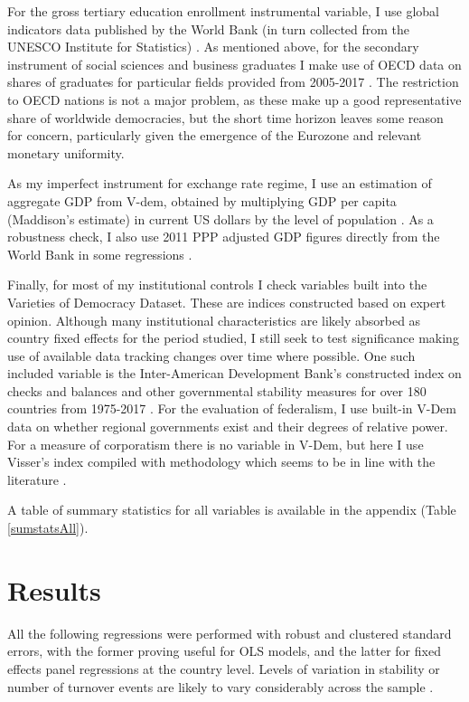 \documentclass{article}
\begin{document}
    For the gross tertiary education enrollment instrumental variable, I use global indicators data published by the World Bank (in turn collected from the UNESCO Institute for Statistics) \citep{world_bank_school_2020}. As mentioned above, for the secondary instrument of social sciences and business graduates I make use of OECD data on shares of graduates for particular fields provided from 2005-2017 \citep{oecd_students_2020}. The restriction to OECD nations is not a major problem, as these make up a good representative share of worldwide democracies, but the short time horizon leaves some reason for concern, particularly given the emergence of the Eurozone and relevant monetary uniformity.

    As my imperfect instrument for exchange rate regime, I use an estimation of aggregate GDP from V-dem, obtained by multiplying GDP per capita (Maddison’s estimate) in current US dollars by the level of population \citep{michael_coppedge_v-dem_2020}. As a robustness check, I also use 2011 PPP adjusted GDP figures directly from the World Bank in some regressions \citep{world_bank_gdp_2020}.

    Finally, for most of my institutional controls I check variables built into the Varieties of Democracy Dataset. These are indices constructed based on expert opinion. Although many institutional characteristics are likely absorbed as country fixed effects for the period studied, I still seek to test significance making use of available data tracking changes over time where possible. One such included variable is the Inter-American Development Bank’s constructed index on checks and balances and other governmental stability measures for over 180 countries from 1975-2017 \citep{scartascini_database_2018}. For the evaluation of federalism, I use built-in V-Dem data on whether regional governments exist and their degrees of relative power. For a measure of corporatism there is no variable in V-Dem, but here I use Visser’s index compiled with methodology which seems to be in line with the literature \citep{kenworthy_quantitative_2003,visser_ictwss_2019}.

    A table of summary statistics for all variables is available in the appendix (Table \ref*{sumstatsAll}).    

    \section*{Results}

    All the following regressions were performed with robust and clustered standard errors, with the former proving useful for OLS models, and the latter for fixed effects panel regressions at the country level. Levels of variation in stability or number of turnover events are likely to vary considerably across the sample \citep{bernhard_political_2002-1}.
\end{document}
